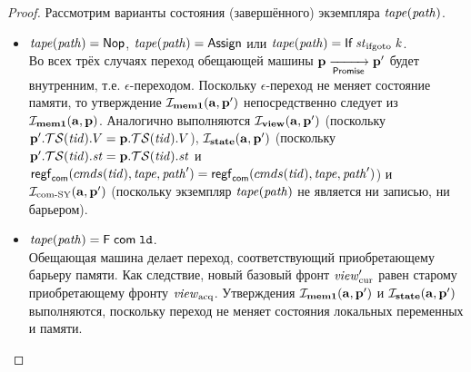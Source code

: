 \begin{proof}

Рассмотрим варианты состояния (завершённого) экземпляра $\mathit{tape}(\mathit{path})$.
\begin{itemize}
  \item $\mathit{tape}(\mathit{path}) = \textsf{Nop}$, $\mathit{tape}(\mathit{path}) = \textsf{Assign}$ или $\tape(\cpath) = \tapeIfGoto{\IfState}{\z}$. \\
    Во всех трёх случаях переход обещающей машины $\mathbf{p} \xrightarrow[\mathsf{Promise}]{} \mathbf{p}'$ будет внутренним, т.е. $\epsilon$-переходом.
    Поскольку $\epsilon$-переход не меняет состояние памяти, то утверждение $\mathcal{I}_{\rm \bf mem1}(\mathbf{a}, \mathbf{p}')$ непосредственно
    следует из $\mathcal{I}_{\rm \bf mem1}(\mathbf{a}, \mathbf{p})$.
    Аналогично выполняются $\mathcal{I}_{\rm \bf view} (\mathbf{a}, \mathbf{p}')$ (поскольку $\mathbf{p}'.\mathcal{TS}(\mathit{tid}).V = \mathbf{p}.\mathcal{TS}(\mathit{tid}).V$),
    $\mathcal{I}_{\rm \bf state}(\mathbf{a}, \mathbf{p}')$ (поскольку $\mathbf{p}'.\mathcal{TS}(\mathit{tid}).\mathit{st} = \mathbf{p}.\mathcal{TS}(\mathit{tid}).\mathit{st}$ и
    $\mathsf{regf}_\mathsf{com}({cmds}(\mathit{tid}), \mathit{tape}, \mathit{path}') = \mathsf{regf}_\mathsf{com}({cmds}(\mathit{tid}), \mathit{tape}, \mathit{path}')$) и 
    $\mathcal{I}_{\textup{\rm com-SY}}(\mathbf{a}, \mathbf{p}')$ (поскольку экземпляр $\mathit{tape}(\mathit{path})$ не является ни записью, ни барьером).

  \item $\mathit{tape}(\mathit{path}) = \textsf{F} \; \mathsf{com} \; \mathtt{ld}$. \\
    Обещающая машина делает переход, соответствующий приобретающему барьеру памяти.
    Как следствие, новый базовый фронт $\mathit{view}_{\mathrm{cur}}'$ равен старому приобретающему фронту $\mathit{view}_{\mathrm{acq}}$.
    Утверждения $\mathcal{I}_{\rm \bf mem1}(\mathbf{a}, \mathbf{p}')$ и $\mathcal{I}_{\rm \bf state}(\mathbf{a}, \mathbf{p}')$ выполняются, поскольку
    переход не меняет состояния локальных переменных и памяти.


\end{itemize}
\end{proof}
